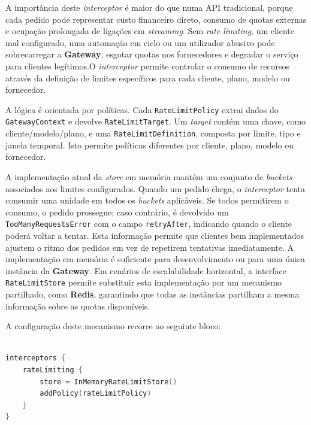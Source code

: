     A importância deste \textit{interceptor} é maior do que numa API tradicional, porque cada pedido pode representar custo financeiro direto, consumo de quotas externas e ocupação prolongada de ligações em \textit{streaming}. Sem \textit{rate limiting}, um cliente mal configurado, uma automação em ciclo ou um utilizador abusivo pode sobrecarregar a \textbf{Gateway}, esgotar quotas nos fornecedores e degradar o serviço para clientes legítimos.O \textit{interceptor} permite controlar o consumo de recursos através da definição de limites específicos para cada cliente, plano, modelo ou fornecedor.

    A lógica é orientada por políticas. Cada \texttt{RateLimitPolicy} extrai dados do \texttt{GatewayContext} e devolve \texttt{RateLimitTarget}. Um \textit{target} contém uma chave, como cliente/modelo/plano, e uma \texttt{RateLimitDefinition}, composta por limite, tipo e janela temporal. Isto permite políticas diferentes por cliente, plano, modelo ou fornecedor.

    A implementação atual da \textit{store} em memória mantém um conjunto de \textit{buckets} associados aos limites configurados. Quando um pedido chega, o \textit{interceptor} tenta consumir uma unidade em todos os \textit{buckets} aplicáveis. Se todos permitirem o consumo, o pedido prossegue; caso contrário, é devolvido um \texttt{TooManyRequestsError} com o campo \texttt{retryAfter}, indicando quando o cliente poderá voltar a tentar. Esta informação permite que clientes bem implementados ajustem o ritmo dos pedidos em vez de repetirem tentativas imediatamente. A implementação em memória é suficiente para desenvolvimento ou para uma única instância da \textbf{Gateway}. Em cenários de escalabilidade horizontal, a interface \texttt{RateLimitStore} permite substituir esta implementação por um mecanismo partilhado, como \textbf{Redis}, garantindo que todas as instâncias partilham a mesma informação sobre as quotas disponíveis.

    A configuração deste mecanismo recorre ao seguinte bloco:

    \vspace{0.5em}
    \begin{lstlisting}[language=kotlin, caption={DSL de configuração do \textit{interceptor} de \textit{rate limiting}}]

interceptors {
    rateLimiting {
        store = InMemoryRateLimitStore()
        addPolicy(rateLimitPolicy)
    }
}
    \end{lstlisting}

